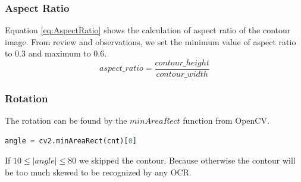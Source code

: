 \documentclass{standalone}
\begin{document}
\subsubsection{Aspect Ratio}
Equation \ref{eq:AspectRatio} shows the calculation of aspect ratio of the contour image. From review and observations, we set the minimum value of aspect ratio to $0.3$ and maximum to $0.6$.
\begin{equation} \label{eq:AspectRatio}
aspect\_ratio = \dfrac{contour\_height}{contour\_width}
\end{equation}

\subsubsection{Rotation}
The rotation can be found by the $minAreaRect$ function from OpenCV. 
\begin{lstlisting}[language=Python]
angle = cv2.minAreaRect(cnt)[0]
\end{lstlisting}
If $10 \leq |angle| \leq 80$ we skipped the contour. Because otherwise the contour will be too much skewed to be recognized by any OCR.
\end{document}
